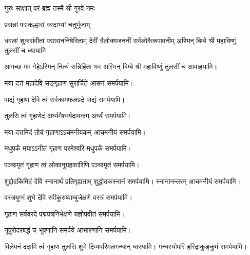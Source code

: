 
{गुरुः साक्षात् परं ब्रह्म तस्मै श्री गुरवे नमः}

\centering

{प्रसन्नां पद्मकल्हारां वरदाभ्यां चतुर्भुजाम्}

{धवलां शुकसंवीतां पद्मासननिषेविताम्}
{देवीं त्रैलोक्यजननीं सर्वलोकैकपावनीम्}
अस्मिन् बिम्बे श्री महाविष्णुं तुलसीं च ध्यायामि।

{आगच्छ मम गेहेऽस्मिन् नित्यं सन्निहिता भव}
अस्मिन् बिम्बे श्री महाविष्णुं तुलसीं च आवाहयामि।
\medskip

\medskip
{}
{मया दत्तं महादेवि सङ्गृहाण सुरार्चिते}
 आसनं समर्पयामि।\medskip

{पाद्यं गृहाण देवि त्वं सर्वकामफलप्रदे}
 पाद्यं समर्पयामि।\medskip

{तुलसि त्वं गृहाणेदं अर्घ्यमैश्वर्यदायकम्}
 अर्घ्यं समर्पयामि।\medskip

{मया दत्तमिदं तोयं गृहाणाऽऽचमनीयकम्}
 आचमनीयं समर्पयामि।\medskip

{मधुपर्कं मयाऽऽनीतं गृहाण परमेश्वरि}
मधुपर्कं समर्पयामि।\medskip

{पञ्चामृतं गृहाण त्वं लोकानुग्रहकारिणि}
पञ्चामृतं समर्पयामि।\medskip


{शुद्दोदकिमिदं देवि स्नानार्थं प्रतिगृह्यताम्}
 शुद्धोदकस्नानं समर्पयामि। स्नानानन्तरम् आचमनीयं समर्पयामि।\medskip

 {वस्त्रयुग्मं शुभे देवि स्वीकुरुष्वाम्बुजेक्षणे}
 वस्त्रं समर्पयामि।\medskip

{गृहाण सर्ववरदे पद्मपत्रनिभेक्षणे}
 यज्ञोपवीतं समर्पयामि।\medskip

{नूपुरोदरबद्धं च भूषणानि समर्पये}
आभारणानि समर्पयामि।\medskip
 
{विलेपनं ददामि त्वं गृहाण तुलसि शुभे}
 दिव्यपरिमलगन्धान् धारयामि। गन्धस्योपरि हरिद्राकुङ्कुमं समर्पयामि। 

